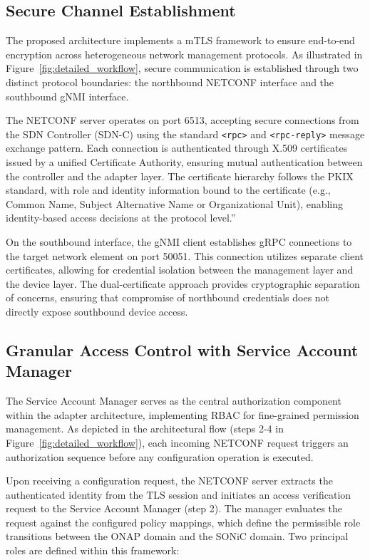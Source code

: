 \documentclass[12pt, a4paper, reqno, oneside]{book}
\begin{document}
\subsection{Secure Channel Establishment}
\label{sec:secure_channel}

The proposed architecture implements a mTLS framework to ensure end-to-end encryption across heterogeneous network management protocols. As illustrated in Figure~\ref{fig:detailed_workflow}, secure communication is established through two distinct protocol boundaries: the northbound NETCONF interface and the southbound gNMI interface.

The NETCONF server operates on port 6513, accepting secure connections from the SDN Controller (SDN-C) using the standard \texttt{<rpc>} and \texttt{<rpc-reply>} message exchange pattern. Each connection is authenticated through X.509 certificates issued by a unified Certificate Authority, ensuring mutual authentication between the controller and the adapter layer. The certificate hierarchy follows the PKIX standard, with role and identity information bound to the certificate (e.g., Common Name, Subject Alternative Name or Organizational Unit), enabling identity-based access decisions at the protocol level.”

On the southbound interface, the gNMI client establishes gRPC connections to the target network element on port 50051. This connection utilizes separate client certificates, allowing for credential isolation between the management layer and the device layer. The dual-certificate approach provides cryptographic separation of concerns, ensuring that compromise of northbound credentials does not directly expose southbound device access.

\subsection{Granular Access Control with Service Account Manager}
\label{sec:granular_access}

The Service Account Manager serves as the central authorization component within the adapter architecture, implementing RBAC for fine-grained permission management. As depicted in the architectural flow (steps 2-4 in Figure~\ref{fig:detailed_workflow}), each incoming NETCONF request triggers an authorization sequence before any configuration operation is executed.

Upon receiving a configuration request, the NETCONF server extracts the authenticated identity from the TLS session and initiates an access verification request to the Service Account Manager (step 2). The manager evaluates the request against the configured policy mappings, which define the permissible role transitions between the ONAP domain and the SONiC domain. Two principal roles are defined within this framework:
\end{document}
